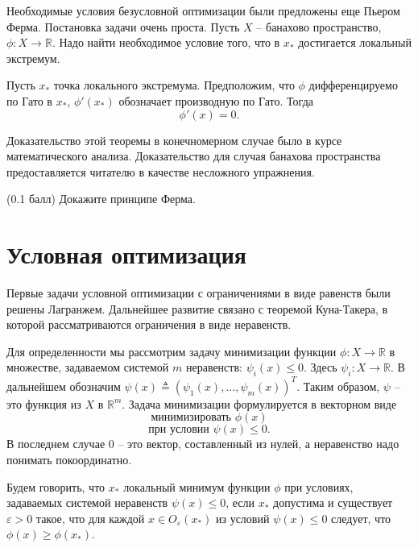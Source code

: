 \documentclass[a4paper,12pt]{report}
\begin{document}
Необходимые условия безусловной оптимизации были предложены еще Пьером Ферма. Постановка задачи очень проста. Пусть $X$ -- банахово пространство, $\phi:X\rightarrow \mathbb{R}$. Надо найти необходимое условие того, что в $x_*$ достигается локальный экстремум.
\begin{theorem}\label{th:Fermat}
 Пусть $x_*$ точка локального экстремума. Предположим, что $\phi$ дифференцируемо по Гато в $x_*$, $\phi'(x_*)$ обозначает производную по Гато. Тогда
 $$ \phi'(x)=0.$$
\end{theorem} 

Доказательство этой теоремы в конечномерном случае было в курсе математического анализа. Доказательство для случая банахова пространства предоставляется читателю в качестве несложного упражнения.
\begin{task}(0.1 балл) Докажите принципе Ферма.
\end{task}

\section{Условная оптимизация}
Первые задачи условной оптимизации с ограничениями в виде равенств были решены Лагранжем. Дальнейшее развитие связано с теоремой Куна-Такера, в которой рассматриваются ограничения в виде неравенств.

Для определенности мы рассмотрим задачу минимизации функции $\phi:X\rightarrow\mathbb{R}$ в множестве, задаваемом системой $m$ неравенств: $\psi_i(x)\leq 0$. Здесь $\psi_i:X\rightarrow \mathbb{R}$. В дальнейшем обозначим $\psi(x)\triangleq (\psi_1(x),\ldots,\psi_m(x))^T$. Таким образом, $\psi$ -- это функция из $X$ в $\mathbb{R}^m$. Задача минимизации формулируется в векторном виде
\begin{equation}\label{problem:kuhn_tacker_statement}
\text{минимизировать } \phi(x) 
\end{equation}
\begin{equation}\label{problem:kuhn_tacker_conditions}
\text{при условии }\psi(x)\leq 0. 
\end{equation} В последнем случае $0$ -- это вектор, составленный из нулей, а неравенство надо понимать покоординатно.
\begin{definition}\label{def:cond_minimum} Будем говорить, что $x_*$ локальный минимум функции $\phi$ при условиях, задаваемых системой неравенств $\psi(x)\leq 0$, если $x_*$ допустима и существует $\varepsilon>0$ такое, что для каждой $x\in O_\varepsilon(x_*)$ из условий $\psi(x)\leq 0$ следует, что $\phi(x)\geq \phi(x_*)$. 
\end{definition}
\end{document}
